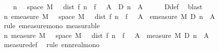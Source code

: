 \begin{isabellebody}
\ \ \isamarkupfalse%
\ {\isachardoublequoteopen}{\isasymAnd}n{\isachardot}{\kern0pt}\ {\isacharbraceleft}{\kern0pt}{\isasymomega}\ {\isasymin}\ space\ M{\isachardot}{\kern0pt}\ {\isasymepsilon}\ {\isacharless}{\kern0pt}\ dist\ {\isacharparenleft}{\kern0pt}f{\isacharprime}{\kern0pt}\ n\ {\isasymomega}{\isacharparenright}{\kern0pt}\ {\isacharparenleft}{\kern0pt}f\ {\isasymomega}{\isacharparenright}{\kern0pt}{\isacharbraceright}{\kern0pt}\ {\isasyminter}\ A\ {\isasymsubseteq}\ {\isacharparenleft}{\kern0pt}D\ n\ {\isasyminter}\ A{\isacharparenright}{\kern0pt}{\isachardoublequoteclose}\isanewline
\ \ \ \ \isamarkupfalse%
\ D{\isacharunderscore}{\kern0pt}def\ \isamarkupfalse%
\ blast\isanewline
\ \ \isamarkupfalse%
\ \isamarkupfalse%
\ {\isachardoublequoteopen}{\isasymAnd}n{\isachardot}{\kern0pt}\ emeasure\ M\ {\isacharparenleft}{\kern0pt}{\isacharbraceleft}{\kern0pt}{\isasymomega}\ {\isasymin}\ space\ M{\isachardot}{\kern0pt}\ {\isasymepsilon}\ {\isacharless}{\kern0pt}\ dist\ {\isacharparenleft}{\kern0pt}f{\isacharprime}{\kern0pt}\ n\ {\isasymomega}{\isacharparenright}{\kern0pt}\ {\isacharparenleft}{\kern0pt}f\ {\isasymomega}{\isacharparenright}{\kern0pt}{\isacharbraceright}{\kern0pt}\ {\isasyminter}\ A{\isacharparenright}{\kern0pt}\ {\isasymle}\ emeasure\ M\ {\isacharparenleft}{\kern0pt}D\ n\ {\isasyminter}\ A{\isacharparenright}{\kern0pt}{\isachardoublequoteclose}\isanewline
\ \ \ \ \isamarkupfalse%
\ {\isacharparenleft}{\kern0pt}rule\ emeasure{\isacharunderscore}{\kern0pt}mono{\isacharparenright}{\kern0pt}\ measurable\isanewline
\ \ \isamarkupfalse%
\ \isamarkupfalse%
\ {\isachardoublequoteopen}{\isasymAnd}n{\isachardot}{\kern0pt}\ measure\ M\ {\isacharparenleft}{\kern0pt}{\isacharbraceleft}{\kern0pt}{\isasymomega}\ {\isasymin}\ space\ M{\isachardot}{\kern0pt}\ {\isasymepsilon}\ {\isacharless}{\kern0pt}\ dist\ {\isacharparenleft}{\kern0pt}f{\isacharprime}{\kern0pt}\ n\ {\isasymomega}{\isacharparenright}{\kern0pt}\ {\isacharparenleft}{\kern0pt}f\ {\isasymomega}{\isacharparenright}{\kern0pt}{\isacharbraceright}{\kern0pt}\ {\isasyminter}\ A{\isacharparenright}{\kern0pt}\ {\isasymle}\ measure\ M\ {\isacharparenleft}{\kern0pt}D\ n\ {\isasyminter}\ A{\isacharparenright}{\kern0pt}{\isachardoublequoteclose}\isanewline
\ \ \ \ \isamarkupfalse%
\ measure{\isacharunderscore}{\kern0pt}def\ \isamarkupfalse%
\ {\isacharparenleft}{\kern0pt}rule\ enn{}real{\isacharunderscore}{\kern0pt}mono{\isacharparenright}{\kern0pt}\isanewline

\end{isabellebody}
